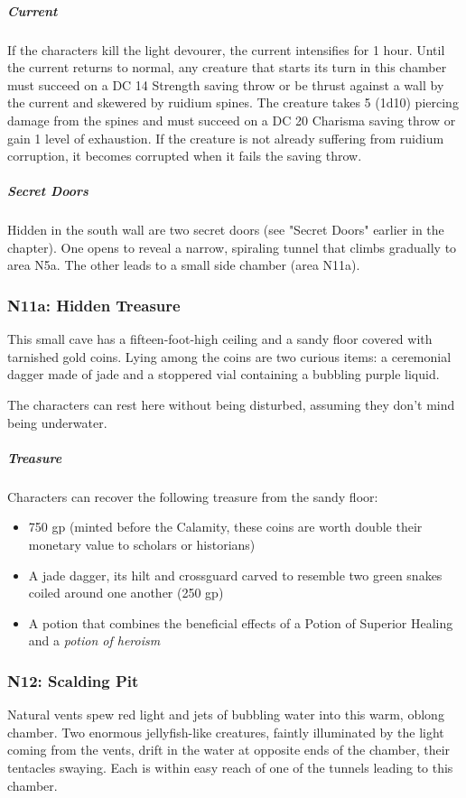 \documentclass[10pt,a4paper,twoside,fancy,bg=print,twocolumn,openany,nodeprecatedcode]{dndbook}
\begin{document}
\subparagraph{Current}
If the characters kill the light devourer, the current intensifies for 1 hour. Until the current returns to normal, any creature that starts its turn in this chamber must succeed on a DC 14 Strength saving throw or be thrust against a wall by the current and skewered by ruidium spines. The creature takes 5 (1d10) piercing damage from the spines and must succeed on a DC 20 Charisma saving throw or gain 1 level of exhaustion. If the creature is not already suffering from ruidium corruption, it becomes corrupted when it fails the saving throw.

\subparagraph{Secret Doors}
Hidden in the south wall are two secret doors (see "Secret Doors" earlier in the chapter). One opens to reveal a narrow, spiraling tunnel that climbs gradually to area N5a. The other leads to a small side chamber (area N11a).

\subsubsection{N11a: Hidden Treasure}
\begin{DndReadAloud}{}
This small cave has a fifteen-foot-high ceiling and a sandy floor covered with tarnished gold coins. Lying among the coins are two curious items: a ceremonial dagger made of jade and a stoppered vial containing a bubbling purple liquid.

\end{DndReadAloud}

The characters can rest here without being disturbed, assuming they don't mind being underwater.

\subparagraph{Treasure}
Characters can recover the following treasure from the sandy floor:


\begin{itemize}
\item 750 gp (minted before the Calamity, these coins are worth double their monetary value to scholars or historians)
\item A jade dagger, its hilt and crossguard carved to resemble two green snakes coiled around one another (250 gp)
\item A potion that combines the beneficial effects of a Potion of Superior Healing and a \textit{potion of heroism}
\end{itemize}

\subsubsection{N12: Scalding Pit}
\begin{DndReadAloud}{}
Natural vents spew red light and jets of bubbling water into this warm, oblong chamber. Two enormous jellyfish-like creatures, faintly illuminated by the light coming from the vents, drift in the water at opposite ends of the chamber, their tentacles swaying. Each is within easy reach of one of the tunnels leading to this chamber.

\end{DndReadAloud}
\end{document}
